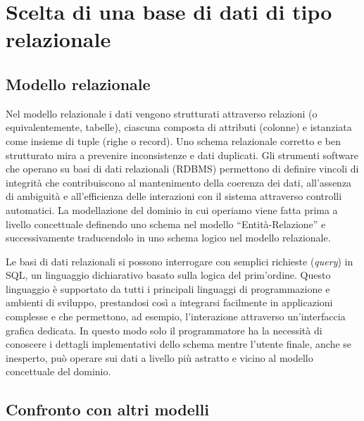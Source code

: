 \section{Scelta di una base di dati di tipo relazionale}

\subsection{Modello relazionale}

Nel modello relazionale \cite{Cod70} i dati vengono strutturati attraverso relazioni (o equivalentemente, tabelle), ciascuna composta di attributi (colonne) e istanziata come insieme di tuple (righe o record).
Uno schema relazionale corretto e ben strutturato mira a prevenire inconsistenze e dati duplicati.
Gli strumenti software che operano su basi di dati relazionali (RDBMS) permettono di definire vincoli di integrità che contribuiscono al mantenimento della coerenza dei dati, all'assenza di ambiguità e all'efficienza delle interazioni con il sistema attraverso controlli automatici.
La modellazione del dominio in cui operiamo viene fatta prima a livello concettuale definendo uno schema nel modello \enquote{Entità-Relazione} e successivamente traducendolo in uno schema logico nel modello relazionale.

Le basi di dati relazionali si possono interrogare con semplici richieste (\emph{query}) in SQL, un linguaggio dichiarativo basato sulla logica del prim'ordine.
Questo linguaggio è supportato da tutti i principali linguaggi di programmazione e ambienti di sviluppo, prestandosi così a integrarsi facilmente in applicazioni complesse e che permettono, ad esempio, l'interazione attraverso un'interfaccia grafica dedicata.
In questo modo solo il programmatore ha la necessità di conoscere i dettagli implementativi dello schema mentre l'utente finale, anche se inesperto, può operare sui dati a livello più astratto e vicino al modello concettuale del dominio.

\subsection{Confronto con altri modelli}

